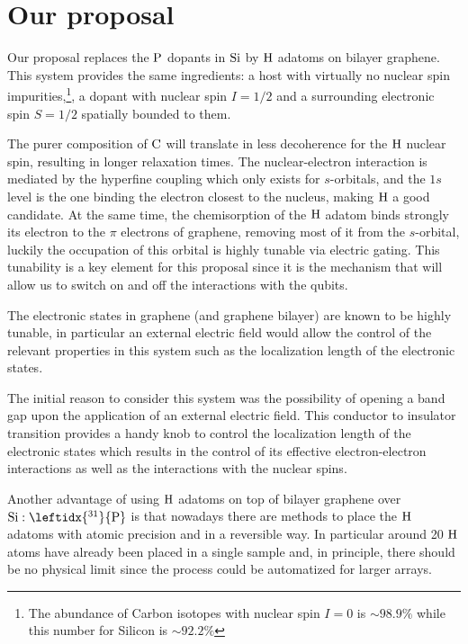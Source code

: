 \section{Our proposal}
Our proposal replaces the $\ce{P}$ dopants in $\ce{Si}$ by $\ce{H}$ adatoms on bilayer graphene.
This system provides the same ingredients: a host with virtually no nuclear spin impurities,\footnote{The abundance of Carbon isotopes with nuclear spin $I=0$ is $\sim98.9\%$ while this number for Silicon is $\sim92.2\%$}, a dopant with nuclear spin $I=1/2$ and a surrounding electronic spin $S=1/2$ spatially bounded to them.

The purer composition of $\ce{C}$ will translate in less decoherence for the $\ce{H}$ nuclear spin, resulting in longer relaxation times. The nuclear-electron interaction is mediated by the hyperfine coupling which only exists for $s$-orbitals, and the $1s$ level is the one binding the electron closest to the nucleus, making $\ce{H}$ a good candidate.
%
At the same time, the chemisorption of the $\ce{H}$ adatom binds strongly its electron to the $\pi$ electrons of graphene, removing most of it from the $s$-orbital, luckily the occupation of this orbital is highly tunable via electric gating. This tunability is a key element for this proposal since it is the mechanism that will allow us to switch on and off the interactions with the qubits.

The electronic states in graphene (and graphene bilayer) are known to be highly tunable, in particular an external electric field would allow the control of the relevant properties in this system such as the localization length of the electronic states.


The initial reason to consider this system was the possibility of opening a band gap upon the application of an external electric field\cite{McCann2006, Castro2007, Oostinga2007, Zhang2009, Taychatanapat2010, Castro2010a, Ponomarenko2011, Allen2012, Sui2015}.
This conductor to insulator transition provides a handy knob to control the localization length of the electronic states which results in the control of its effective electron-electron interactions as well as the interactions with the nuclear spins.

Another advantage of using $\ce{H}$ adatoms on top of bilayer graphene over $\ce{Si}:\leftidx{^{31}}{\ce{P}}$ is that nowadays there are methods to place the $\ce{H}$ adatoms with atomic precision and in a reversible way\cite{elias2009,Brihuega2016,Brihuega2017}. In particular around 20 $\ce{H}$ atoms have already been placed in a single sample and, in principle, there should be no physical limit since the process could be automatized for larger arrays.
\medskip

